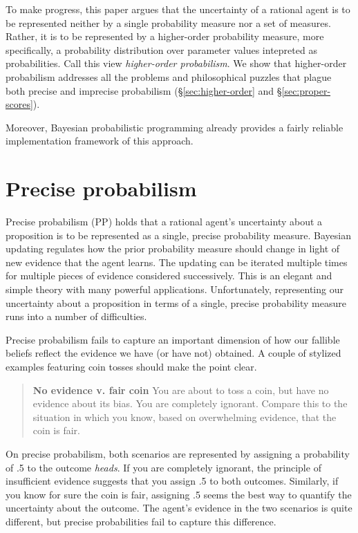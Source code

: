 \documentclass[
  letterpaper,
  DIV=11,
  numbers=noendperiod]{scrartcl}
\begin{document}
To make progress, this paper argues that the uncertainty of a rational
agent is to be represented neither by a single probability measure nor a
set of measures. Rather, it is to be represented by a higher-order
probability measure, more specifically, a probability distribution over
parameter values intepreted as probabilities. Call this view
\emph{higher-order probabilism}. We show that higher-order probabilism
addresses all the problems and philosophical puzzles that plague both
precise and imprecise probabilism (\S \ref{sec:higher-order} and
\S \ref{sec:proper-scores}).

Moreover, Bayesian probabilistic programming already provides a fairly
reliable implementation framework of this approach.



\hypertarget{precise-probabilism}{%
\section{Precise probabilism}\label{precise-probabilism}}

\label{sec:precise-probabilism}

Precise probabilism (\textsf{PP}) holds that a rational agent's
uncertainty about a proposition is to be represented as a single,
precise probability measure. Bayesian updating regulates how the prior
probability measure should change in light of new evidence that the
agent learns. The updating can be iterated multiple times for multiple
pieces of evidence considered successively. This is an elegant and
simple theory with many powerful applications. Unfortunately,
representing our uncertainty about a proposition in terms of a single,
precise probability measure runs into a number of difficulties.

Precise probabilism fails to capture an important dimension of how our
fallible beliefs reflect the evidence we have (or have not) obtained. A
couple of stylized examples featuring coin tosses should make the point
clear.

\begin{quote}
\textbf{No evidence v. fair coin}
You are about to toss a coin, but have no evidence 
about its bias. You are completely ignorant. 
Compare this to the situation in which you know, 
based on overwhelming evidence, that the coin is fair. 
\end{quote}

\noindent On precise probabilism, both scenarios are represented by
assigning a probability of .5 to the outcome \emph{heads}. If you are
completely ignorant, the principle of insufficient evidence suggests
that you assign .5 to both outcomes. Similarly, if you know for sure the
coin is fair, assigning .5 seems the best way to quantify the
uncertainty about the outcome. The agent's evidence in the two scenarios
is quite different, but precise probabilities fail to capture this
difference.
\end{document}
